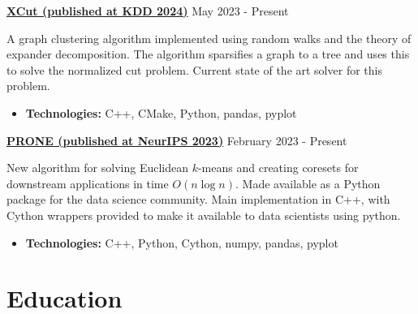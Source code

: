 \documentclass[a4paper, 10pt]{article}
\newcommand{\bulletSpace}{\vspace{-4pt}}
\newcommand{\secStartSpace}{\vspace{3pt}}
\newcommand{\secEndSpace}{\vspace{5pt}}
\newcommand{\spaceCollapse}{\vspace{-2pt}}
\newcommand{\projectHeader}[3]{
\noindent\href{#2}{\large\textbf{#1}} \hfill \normalsize#3 \vspace{2pt}
}
\begin{document}
\begin{addmargin}[0.5em]{1em}

		
	\projectHeader{XCut (published at KDD 2024)}{https://gitlab.com/vietaa/xcut}{May 2023 - Present}
		
	\noindent A graph clustering algorithm implemented using random walks and the theory of expander decomposition.
	The algorithm sparsifies a graph to a tree and uses this to solve the normalized cut problem. Current state of the art solver for this problem.
	\spaceCollapse
	\begin{itemize}
		\item \textbf{Technologies:} C++, CMake, Python, pandas, pyplot
		      \bulletSpace
	\end{itemize}

     \vspace{8pt}
 
	\projectHeader{PRONE (published at NeurIPS 2023)}{https://github.com/boredoms/prone}{February 2023 - Present}
		
	\noindent New algorithm for solving Euclidean $k$-means and creating coresets for downstream applications in time $O(n \log n)$. 
	Made available as a Python package for the data science community.
	Main implementation in C++, with Cython wrappers provided to make it available to data scientists using python.
	\spaceCollapse
	\begin{itemize}
		\item \textbf{Technologies:} C++, Python, Cython, numpy, pandas, pyplot
		      \bulletSpace
	\end{itemize}
\end{addmargin}
\secEndSpace
\secEndSpace


\section{\color{highlight} \textbf{Education}}
\secStartSpace
\end{document}
